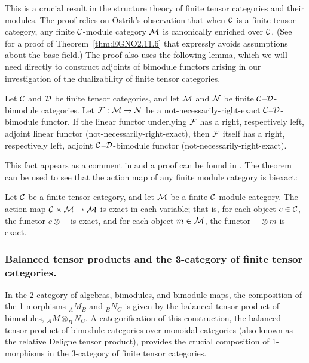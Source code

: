 \documentclass{amsart}
\begin{document}
\nid This is a crucial result in the structure theory of finite tensor categories and their modules.  The proof relies on Ostrik's observation \cite{MR1976459, EO-ftc} that when $\mathcal C$ is a finite tensor category, any finite $\mathcal C$-module category $\mathcal M$ is canonically enriched over $\mathcal C$.  (See~\cite{BTP} for a proof of Theorem~\ref{thm:EGNO2.11.6} that expressly avoids assumptions about the base field.)  The proof also uses the following lemma, which we will need directly to construct adjoints of bimodule functors arising in our investigation of the dualizability of finite tensor categories.

\begin{lemma} \label{lma:module-adjoint}
Let $\mathcal C$ and $\mathcal D$ be finite tensor categories, and let $\mathcal M$ and $\mathcal N$ be finite $\mathcal C$--$\mathcal D$-bimodule categories.  Let $\mathcal F: \mathcal M \to \mathcal N$ be a not-necessarily-right-exact $\mathcal C$--$\mathcal D$-bimodule functor.  If the linear functor underlying $\mathcal F$ has a right, respectively left, adjoint linear functor (not-necessarily-right-exact), then $\mathcal F$ itself has a right, respectively left, adjoint $\mathcal C$--$\mathcal D$-bimodule functor (not-necessarily-right-exact).
\end{lemma}


\nid This fact appears as a comment in \cite{EO-ftc} and a proof can be found in \cite{BTP}.  The theorem can be used to see that the action map of any finite module category is biexact:
\begin{corollary} \label{cor:biexact_action}
Let $\mathcal C$ be a finite tensor category, and let $\mathcal M$ be a finite $\mathcal C$-module category.  The action map $\mathcal C \times \mathcal M \rightarrow \mathcal M$ is exact in each variable; that is, for each object $c \in \mathcal C$, the functor $c \otimes -$ is exact, and for each object $m \in \mathcal M$, the functor $- \otimes m$ is exact.
\end{corollary}


\subsubsection{Balanced tensor products and the 3-category of finite tensor categories.}

In the 2-category of algebras, bimodules, and bimodule maps, the composition of the 1-morphisms $_A M_B$ and $_B N_C$ is given by the balanced tensor product of bimodules, $_A M \otimes_B N_C$.  A categorification of this construction, the balanced tensor product of bimodule categories over monoidal categories (also known as the relative Deligne tensor product), provides the crucial composition of 1-morphisms in the 3-category of finite tensor categories.
\end{document}
